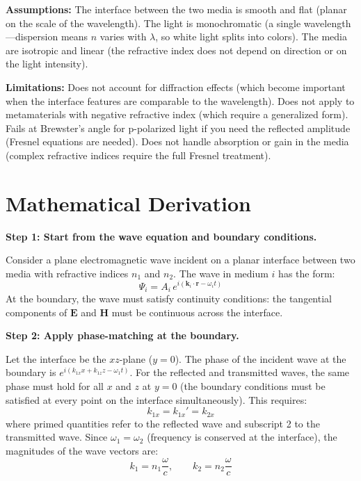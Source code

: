 \textbf{Assumptions:} The interface between the two media is smooth and flat (planar on the scale of the wavelength). The light is monochromatic (a single wavelength---dispersion means $n$ varies with $\lambda$, so white light splits into colors). The media are isotropic and linear (the refractive index does not depend on direction or on the light intensity).


\textbf{Limitations:} Does not account for diffraction effects (which become important when the interface features are comparable to the wavelength). Does not apply to metamaterials with negative refractive index (which require a generalized form). Fails at Brewster's angle for p-polarized light if you need the reflected amplitude (Fresnel equations are needed). Does not handle absorption or gain in the media (complex refractive indices require the full Fresnel treatment).


\section*{Mathematical Derivation}

\textbf{Step 1: Start from the wave equation and boundary conditions.}

Consider a plane electromagnetic wave incident on a planar interface between two media with refractive indices $n_1$ and $n_2$. The wave in medium $i$ has the form:
\begin{equation}
\Psi_i = A_i\,e^{i(\mathbf{k}_i\cdot\mathbf{r} - \omega_i t)}
\end{equation}
At the boundary, the wave must satisfy continuity conditions: the tangential components of $\mathbf{E}$ and $\mathbf{H}$ must be continuous across the interface.

\textbf{Step 2: Apply phase-matching at the boundary.}

Let the interface be the $xz$-plane ($y = 0$). The phase of the incident wave at the boundary is $e^{i(k_{1x}x + k_{1z}z - \omega_1 t)}$. For the reflected and transmitted waves, the same phase must hold for all $x$ and $z$ at $y = 0$ (the boundary conditions must be satisfied at every point on the interface simultaneously). This requires:
\begin{equation}
k_{1x} = k_{1x}' = k_{2x}
\end{equation}
where primed quantities refer to the reflected wave and subscript 2 to the transmitted wave. Since $\omega_1 = \omega_2$ (frequency is conserved at the interface), the magnitudes of the wave vectors are:
\begin{equation}
k_1 = n_1\frac{\omega}{c}, \qquad k_2 = n_2\frac{\omega}{c}
\end{equation}

